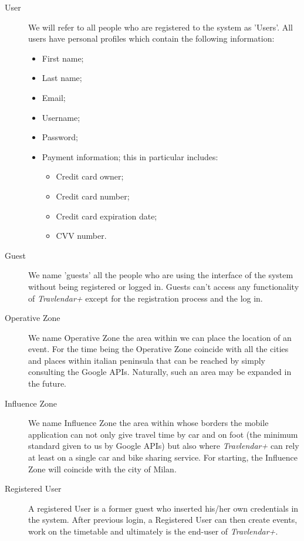 \begin{description}
	\item[User]
		We will refer to all people who are registered to the system as ’Users’. 
		All users have personal profiles which contain the following information:
		\begin{itemize}
			\item First name;
			\item Last name; 
			\item Email;
			\item Username;
			\item Password;
			\item Payment information; this in particular includes:
				\begin{itemize}
					\item Credit card owner;
					\item Credit card number;
					\item Credit card expiration date;
					\item CVV number.
				\end{itemize}
		\end{itemize}
				
		\item[Guest] We name 'guests' all the people who are using the interface of the system without being registered or logged in. Guests can't access any functionality of \textit{Travlendar+} except for the registration process and the log in. 
		
		\item[Operative Zone] We name Operative Zone the area within we can place the location of an event. For the time being the Operative Zone coincide with all the cities and places within italian peninsula that can be reached by simply consulting the Google APIs. Naturally, such an area may be expanded in the future.
				
		\item[Influence Zone] We name Influence Zone the area within whose borders the mobile application can not only give travel time by car and on foot (the minimum standard given to us by Google APIs) but also where \textit{Travlendar+} can rely at least on a single car and bike sharing service. For starting, the Influence Zone will coincide with the city of Milan.
				
		\item[Registered User] A registered User is a former guest who inserted his/her own credentials in the system. After previous login, a Registered User can then create events, work on the timetable and ultimately is the end-user of \textit{Travlendar+}.
				

\end{description}
